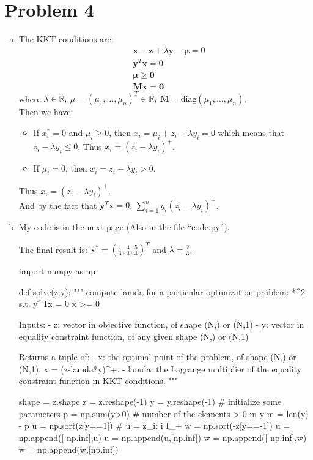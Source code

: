 \documentclass{article}
\def\RR{\mathbb{R}}
\def\bold#1{\boldsymbol{#1}}
\def\bx{\boldsymbol{x}}
\def\by{\boldsymbol{y}}
\def\bz{\boldsymbol{z}}
\def\bM{\boldsymbol{M}}
\begin{document}
\section*{Problem 4}
\begin{enumerate}[(a)]
	\item
		The KKT conditions are:
		\[
			\begin{aligned}
				&\bx-\bz+\lambda\by-\bold{\mu}=0
				\\&
				\by^T\bx=0
				\\&
				\bold{\mu}\ge\bold{0}
				\\&
				\bM\bx=\bold{0}
			\end{aligned}
		\]
		where 
		$
		\lambda\in\RR,\ 
		\mu=(\mu_1,\dots,\mu_n)^T\in\RR,\ 
		\bM=\mbox{diag}(\mu_1,\dots,\mu_n)
		$.
		\\
		Then we have:
		\begin{itemize}
			\item 
				If $x^*_i=0$ and $\mu_i\ge0$, then $x_i=\mu_i+z_i-\lambda y_i=0$ which means that $z_i-\lambda y_i\le0$. Thus $x_i=(z_i-\lambda y_i)^+$.
			\item
				If $\mu_i=0$, then $x_i=z_i-\lambda y_i>0$.
		\end{itemize}
		Thus $x_i=(z_i-\lambda y_i)^+$.
		\\
		And by the fact that $\by^T\bx=0$, 
		$\sum_{i=1}^ny_i(z_i-\lambda y_i)^+$.
	\item
		My code is in the next page 
		(Also in the file ``code.py'').

		The final result is: $\bx^*=(\frac{1}{3},\frac{4}{3},\frac{5}{3})^T$ and $\lambda=\frac{2}{3}$.
		\newpage

\begin{python}
import numpy as np

def solve(z,y):
    """
    compute lamda for a particular optimization problem:
    *^2
    s.t. y^Tx = 0
         x >= 0

    Inputs:
    - z: vector in objective function, of shape (N,) or (N,1)
    - y: vector in equality constraint function, of any given shape (N,) or (N,1)

    Returns a tuple of:
    - x: the optimal point of the problem, of shape (N,) or (N,1). x = (z-lamda*y)^+.
    - lamda: the Lagrange multiplier of the equality constraint function in KKT conditions.
    """

    shape = z.shape
    z = z.reshape(-1)
    y = y.reshape(-1)
    # initialize some parameters
    p = np.sum(y>0) # number of the elements > 0 in y
    m = len(y) - p
    u = np.sort(z[y==1]) # u = {z_i: i \in I_+}
    w = np.sort(-z[y==-1])
    u = np.append([-np.inf],u)
    u = np.append(u,[np.inf])
    w = np.append([-np.inf],w)
    w = np.append(w,[np.inf])


\end{python}
\end{enumerate}
\end{document}
